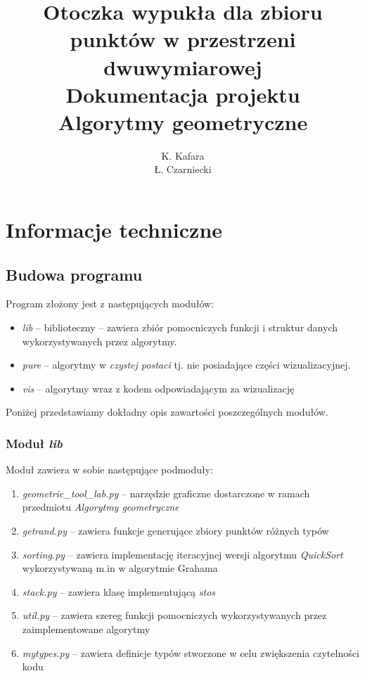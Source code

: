 \documentclass[11pt]{article}
\author{K. Kafara\\Ł. Czarniecki}
\title{\textbf{Otoczka wypukła dla zbioru punktów w przestrzeni dwuwymiarowej}\\Dokumentacja projektu\\Algorytmy geometryczne}
\date{}
\theoremstyle{remark} \newtheorem{definition}{def.}
\theoremstyle{definition} \newtheorem{twierdzenie}{tw.}
\begin{document}
\maketitle



\tableofcontents

\listoffigures

\listoftables

\newpage



\section{Informacje techniczne}

\subsection{Budowa programu}

Program złożony jest z następujących modułów: 

\begin{itemize}
    \item   \emph{lib} -- biblioteczny -- zawiera zbiór pomocniczych funkcji i struktur danych wykorzystywanych przez algorytmy.
    \item   \emph{pure} -- algorytmy w \emph{czystej postaci} tj. nie posiadające części wizualizacyjnej. 
    \item   \emph{vis} -- algorytmy wraz z kodem odpowiadającym za wizualizację
\end{itemize}


Poniżej przedstawiamy dokładny opis zawartości poszczególnych modułów. 

\subsubsection{Moduł \emph{lib}}

Moduł zawiera w sobie następujące podmoduły:

\begin{enumerate}
    \item   \emph{geometric\_tool\_lab.py} -- narzędzie graficzne dostarczone w ramach przedmiotu \emph{Algorytmy geometryczne}
    \item   \emph{getrand.py} -- zawiera funkcje generujące zbiory punktów różnych typów 
    \item   \emph{sorting.py} -- zawiera implementację iteracyjnej wersji algorytmu \emph{QuickSort} wykorzystywaną m.in w algorytmie Grahama
    \item   \emph{stack.py} -- zawiera klasę implementującą \emph{stos}
    \item   \emph{util.py} -- zawiera szereg funkcji pomocniczych wykorzystywanych przez zaimplementowane algorytmy
    \item   \emph{mytypes.py} -- zawiera definicje typów stworzone w celu zwiększenia czytelności kodu
\end{enumerate}
\end{document}
